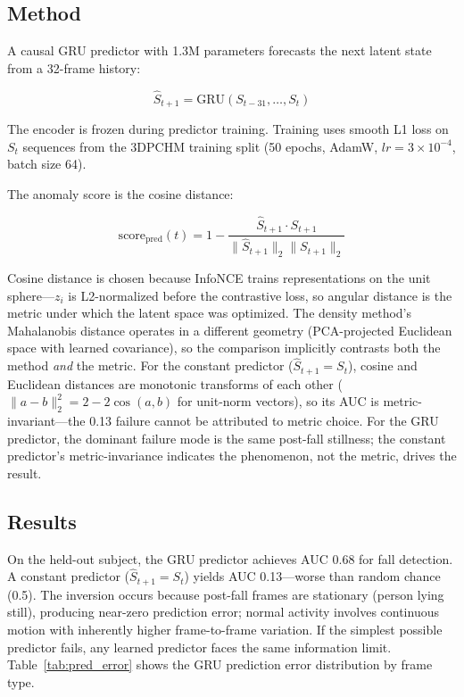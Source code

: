 \documentclass[11pt,a4paper]{article}
\begin{document}
\subsection{Method}

A causal GRU predictor with 1.3M parameters forecasts the next latent state from a 32-frame history:

\begin{equation}
\hat{S}_{t+1} = \text{GRU}(S_{t-31}, \dots, S_t)
\end{equation}

The encoder is frozen during predictor training.
Training uses smooth L1 loss on $S_t$ sequences from the 3DPCHM training split (50 epochs, AdamW, $lr{=}3{\times}10^{-4}$, batch size 64).

The anomaly score is the cosine distance:

\begin{equation}
\text{score}_{\text{pred}}(t) = 1 - \frac{\hat{S}_{t+1} \cdot S_{t+1}}{\|\hat{S}_{t+1}\|_2 \|S_{t+1}\|_2}
\end{equation}

Cosine distance is chosen because InfoNCE trains representations on the unit sphere---$z_i$ is L2-normalized before the contrastive loss, so angular distance is the metric under which the latent space was optimized.
The density method's Mahalanobis distance operates in a different geometry (PCA-projected Euclidean space with learned covariance), so the comparison implicitly contrasts both the method \emph{and} the metric.
For the constant predictor ($\hat{S}_{t+1} = S_t$), cosine and Euclidean distances are monotonic transforms of each other ($\|a-b\|_2^2 = 2 - 2\cos(a,b)$ for unit-norm vectors), so its AUC is metric-invariant---the 0.13 failure cannot be attributed to metric choice.
For the GRU predictor, the dominant failure mode is the same post-fall stillness; the constant predictor's metric-invariance indicates the phenomenon, not the metric, drives the result.

\subsection{Results}

On the held-out subject, the GRU predictor achieves AUC 0.68 for fall detection.
A constant predictor ($\hat{S}_{t+1} = S_t$) yields AUC 0.13---worse than random chance (0.5).
The inversion occurs because post-fall frames are stationary (person lying still), producing near-zero prediction error; normal activity involves continuous motion with inherently higher frame-to-frame variation.
If the simplest possible predictor fails, any learned predictor faces the same information limit.
Table~\ref{tab:pred_error} shows the GRU prediction error distribution by frame type.
\end{document}
